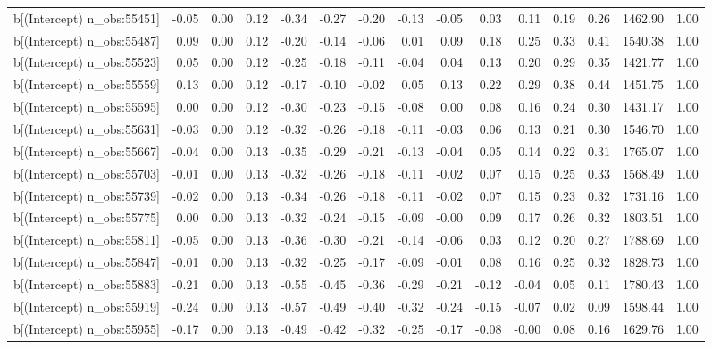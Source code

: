 \begin{table}[ht]
\begin{tabular}{rrrrrrrrrrrrrrr}
  b[(Intercept) n\_obs:55451] & -0.05 & 0.00 & 0.12 & -0.34 & -0.27 & -0.20 & -0.13 & -0.05 & 0.03 & 0.11 & 0.19 & 0.26 & 1462.90 & 1.00 \\ 
  b[(Intercept) n\_obs:55487] & 0.09 & 0.00 & 0.12 & -0.20 & -0.14 & -0.06 & 0.01 & 0.09 & 0.18 & 0.25 & 0.33 & 0.41 & 1540.38 & 1.00 \\ 
  b[(Intercept) n\_obs:55523] & 0.05 & 0.00 & 0.12 & -0.25 & -0.18 & -0.11 & -0.04 & 0.04 & 0.13 & 0.20 & 0.29 & 0.35 & 1421.77 & 1.00 \\ 
  b[(Intercept) n\_obs:55559] & 0.13 & 0.00 & 0.12 & -0.17 & -0.10 & -0.02 & 0.05 & 0.13 & 0.22 & 0.29 & 0.38 & 0.44 & 1451.75 & 1.00 \\ 
  b[(Intercept) n\_obs:55595] & 0.00 & 0.00 & 0.12 & -0.30 & -0.23 & -0.15 & -0.08 & 0.00 & 0.08 & 0.16 & 0.24 & 0.30 & 1431.17 & 1.00 \\ 
  b[(Intercept) n\_obs:55631] & -0.03 & 0.00 & 0.12 & -0.32 & -0.26 & -0.18 & -0.11 & -0.03 & 0.06 & 0.13 & 0.21 & 0.30 & 1546.70 & 1.00 \\ 
  b[(Intercept) n\_obs:55667] & -0.04 & 0.00 & 0.13 & -0.35 & -0.29 & -0.21 & -0.13 & -0.04 & 0.05 & 0.14 & 0.22 & 0.31 & 1765.07 & 1.00 \\ 
  b[(Intercept) n\_obs:55703] & -0.01 & 0.00 & 0.13 & -0.32 & -0.26 & -0.18 & -0.11 & -0.02 & 0.07 & 0.15 & 0.25 & 0.33 & 1568.49 & 1.00 \\ 
  b[(Intercept) n\_obs:55739] & -0.02 & 0.00 & 0.13 & -0.34 & -0.26 & -0.18 & -0.11 & -0.02 & 0.07 & 0.15 & 0.23 & 0.32 & 1731.16 & 1.00 \\ 
  b[(Intercept) n\_obs:55775] & 0.00 & 0.00 & 0.13 & -0.32 & -0.24 & -0.15 & -0.09 & -0.00 & 0.09 & 0.17 & 0.26 & 0.32 & 1803.51 & 1.00 \\ 
  b[(Intercept) n\_obs:55811] & -0.05 & 0.00 & 0.13 & -0.36 & -0.30 & -0.21 & -0.14 & -0.06 & 0.03 & 0.12 & 0.20 & 0.27 & 1788.69 & 1.00 \\ 
  b[(Intercept) n\_obs:55847] & -0.01 & 0.00 & 0.13 & -0.32 & -0.25 & -0.17 & -0.09 & -0.01 & 0.08 & 0.16 & 0.25 & 0.32 & 1828.73 & 1.00 \\ 
  b[(Intercept) n\_obs:55883] & -0.21 & 0.00 & 0.13 & -0.55 & -0.45 & -0.36 & -0.29 & -0.21 & -0.12 & -0.04 & 0.05 & 0.11 & 1780.43 & 1.00 \\ 
  b[(Intercept) n\_obs:55919] & -0.24 & 0.00 & 0.13 & -0.57 & -0.49 & -0.40 & -0.32 & -0.24 & -0.15 & -0.07 & 0.02 & 0.09 & 1598.44 & 1.00 \\ 
  b[(Intercept) n\_obs:55955] & -0.17 & 0.00 & 0.13 & -0.49 & -0.42 & -0.32 & -0.25 & -0.17 & -0.08 & -0.00 & 0.08 & 0.16 & 1629.76 & 1.00 \\ 

\end{tabular}
\end{table}

